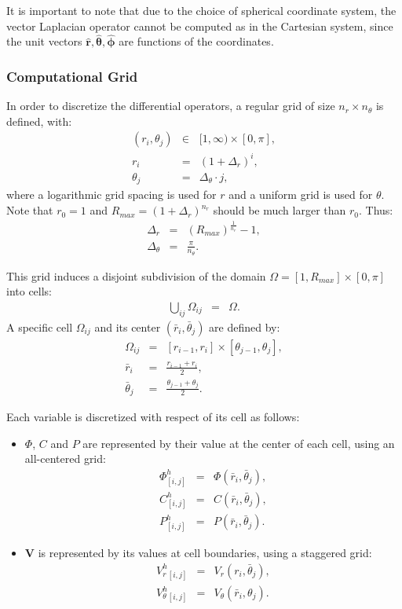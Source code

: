\documentclass[final]{elsarticle}
\newcommand{\pars}[1]{\left(#1\right)}
\newcommand\bV{\boldsymbol{V}}
\newcommand\br{\boldsymbol{r}}
\newcommand\brhat{\hat{\br}}
\newcommand\btheta{\boldsymbol{\theta}}
\newcommand\bthetahat{\hat{\btheta}}
\newcommand\bphi{\boldsymbol{\phi}}
\newcommand\bphihat{\hat{\bphi}}
\begin{document}
It is important to note that due to the choice of spherical coordinate system,
the vector Laplacian operator cannot be computed as in the Cartesian system,
since the unit vectors $\brhat, \bthetahat, \bphihat$ are functions of the coordinates.

\subsubsection{Computational Grid}
In order to discretize the differential operators, 
a regular grid of size $n_r \times n_\theta$ is defined, with:
\begin{eqnarray*}
(r_i,\theta_j) &\in& [1, \infty) \times [0,\pi], \\ 
r_i &=& (1+\Delta_r)^i, \\
\theta_j &=& \Delta_\theta \cdot j,
\end{eqnarray*}
where a logarithmic grid spacing is used for $r$ and a uniform grid is used for $\theta$.
Note that $r_0 = 1$ and $R_{max} = (1+\Delta_r)^{n_r}$ should be much 
larger than $r_0$. Thus:
\begin{eqnarray*}
\Delta_r &=& \pars{R_{max}} ^ \frac{1}{n_r} - 1, \\
\Delta_\theta &=& \frac{\pi}{n_\theta}.
\end{eqnarray*}

This grid induces a disjoint subdivision of the domain 
$\Omega = [1, R_{max}] \times [0,\pi]$ into cells:
\begin{eqnarray*}
\bigcup_{ij}\Omega_{ij} &=& \Omega.
\end{eqnarray*}
A specific cell $\Omega_{ij}$ and its center $(\bar{r}_i, \bar{\theta}_j)$ are defined by:
\begin{eqnarray*}
\Omega_{ij} &=& [r_{i-1}, r_{i}] \times [\theta_{j-1}, \theta_{j}], \\
\bar{r}_i &=& \frac{r_{i-1} + r_{i}}{2}, \\
\bar{\theta}_j &=& \frac{\theta_{j-1} + \theta_{j}}{2}.
\end{eqnarray*}

Each variable is discretized with respect of its cell as follows:
\begin{itemize}
\item $\varPhi$, $C$ and $P$ are represented by their value at the center of each cell, 
using an all-centered grid:
\begin{eqnarray*}
\varPhi^h_{[i,j]} &=& \varPhi(\bar{r}_i, \bar{\theta}_j), \\
C^h_{[i,j]} &=& C(\bar{r}_i, \bar{\theta}_j), \\
P^h_{[i,j]} &=& P(\bar{r}_i, \bar{\theta}_j).
\end{eqnarray*}
\item $\bV$ is represented by its values at cell boundaries, using a staggered grid:
\begin{eqnarray*}
V_r^h{}_{[i,j]} &=& V_r(r_i, \bar{\theta}_j), \\
V_\theta^h{}_{[i,j]} &=& V_\theta(\bar{r}_i, {\theta}_j).
\end{eqnarray*}
\end{itemize}
\end{document}
